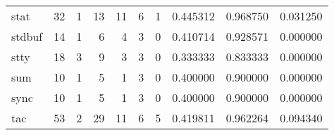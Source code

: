 \begin{longtable}{lrrrrrrrrr}
stat      &                                       32 &                                                  1 &                                                 13 &                                                 11 &                                                  6 &                                                  1 &                                           0.445312 &                               0.968750 &                             0.031250 \\
stdbuf    &                                       14 &                                                  1 &                                                  6 &                                                  4 &                                                  3 &                                                  0 &                                           0.410714 &                               0.928571 &                             0.000000 \\
stty      &                                       18 &                                                  3 &                                                  9 &                                                  3 &                                                  3 &                                                  0 &                                           0.333333 &                               0.833333 &                             0.000000 \\
sum       &                                       10 &                                                  1 &                                                  5 &                                                  1 &                                                  3 &                                                  0 &                                           0.400000 &                               0.900000 &                             0.000000 \\
sync      &                                       10 &                                                  1 &                                                  5 &                                                  1 &                                                  3 &                                                  0 &                                           0.400000 &                               0.900000 &                             0.000000 \\
tac       &                                       53 &                                                  2 &                                                 29 &                                                 11 &                                                  6 &                                                  5 &                                           0.419811 &                               0.962264 &                             0.094340 \\

\end{longtable}
